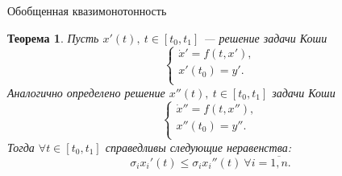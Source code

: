 \documentclass[envcountsect]{beamer}
\newtheorem{rutheorem}{Теорема}
\theoremstyle{definition}
\begin{document}
	\begin{frame}{Обобщенная квазимонотонность}
		\begin{rutheorem}
			Пусть \(x'(t),\ t \in [t_0, t_1]\) --- решение задачи Коши
			\begin{equation}
				\begin{cases} \label{zk1}
					\dot x' = f(t, x'), \\
					x'(t_0) = y'. \\
				\end{cases}
			\end{equation}
			Аналогично определено решение \(x''(t),\ t \in [t_0, t_1]\) задачи Коши
			\begin{equation}
				\begin{cases} \label{zk2}
					\dot x'' = f(t, x''), \\
					x''(t_0) = y''. \\
				\end{cases}
			\end{equation}
			Тогда \(\forall t \in [t_0,t_1]\) справедливы следующие неравенства:
			\begin{equation}
				\sigma_i x_i'(t) \le \sigma_i x_i''(t)\ \forall i = \overline{1,n}.
			\end{equation}
		\end{rutheorem}
	\end{frame}
\end{document}
